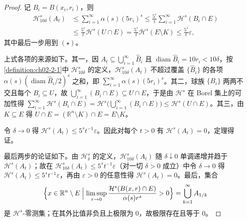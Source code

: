 \documentclass[../../main.tex]{subfiles}%
\begin{document}
\begin{proof}
记 $B_i=B(x_i,r_i)$，则
\begin{align*}
\mathcal{H}^s_{10\delta}(A_t)
&\leqslant\sum_{i=1}^{\infty}\alpha(s)(5r_i)^s
\leqslant\frac{5^s}{t}\sum_{i=1}^{\infty}\mathcal{H}^s(B_i\cap E)\\
&\leqslant\frac{5^s}{t}\mathcal{H}^s(U\cap E)
=\frac{5^s}{t}\mathcal{H}^s(E\setminus K)
\leqslant\frac{5^s}{t}\varepsilon ,
\end{align*}
其中最后一步用到 $(\star)$。

上式各项的来源如下。其一，因 $A_t\subseteq\bigcup_{i=1}^{\infty}\hat B_i$ 且 $\operatorname{diam}\hat B_i=10r_i<10\delta$，按\cref{definition:ch02-2-1}中 $\mathcal{H}^s_{10\delta}$ 的定义，$\mathcal{H}^s_{10\delta}(A_t)$ 不超过覆盖 $\{\hat B_i\}$ 的各项 $\alpha(s)(\operatorname{diam}\hat B_i/2)^s$ 之和，即 $\sum_{i=1}^{\infty}\alpha(s)(5r_i)^s$。其二，球族 $\{B_i\}$ 两两不交且每个 $B_i\subseteq U$，故 $\bigcup_{i=1}^{\infty}(B_i\cap E)\subseteq U\cap E$，于是由 $\mathcal{H}^s$ 在 Borel 集上的可加性得 $\sum_{i=1}^{\infty}\mathcal{H}^s(B_i\cap E)=\mathcal{H}^s\bigl(\bigcup_{i=1}^{\infty}(B_i\cap E)\bigr)\leqslant\mathcal{H}^s(U\cap E)$。其三，由 $K\subseteq E$ 得 $U\cap E=(\mathbb{R}^n\setminus K)\cap E=E\setminus K$。%

令 $\delta\to0$ 得 $\mathcal{H}^s(A_t)\leqslant5^st^{-1}\varepsilon$。因此对每个 $t>0$ 有 $\mathcal{H}^s(A_t)=0$，定理得证。

最后两步的论证如下。由 $\mathcal{H}^s_\delta$ 的定义，$\mathcal{H}^s_{10\delta}(A_t)$ 随 $\delta\downarrow0$ 单调递增并趋于 $\mathcal{H}^s(A_t)$；故在 $\mathcal{H}^s_{10\delta}(A_t)\leqslant5^st^{-1}\varepsilon$（对一切 $\delta>0$ 成立）中令 $\delta\to0$ 得 $\mathcal{H}^s(A_t)\leqslant5^st^{-1}\varepsilon$，再由 $\varepsilon>0$ 的任意性得 $\mathcal{H}^s(A_t)=0$。最后，集合
\begin{align*}
\Bigl\{x\in\mathbb{R}^n\setminus E\Bigm|\limsup_{r\to0}\frac{\mathcal{H}^s(B(x,r)\cap E)}{\alpha(s)r^s}>0\Bigr\}=\bigcup_{k=1}^{\infty}A_{1/k}
\end{align*}
是 $\mathcal{H}^s$-零测集；在其外比值非负且上极限为 $0$，故极限存在且等于 $0$。
\end{proof}
\end{document}
